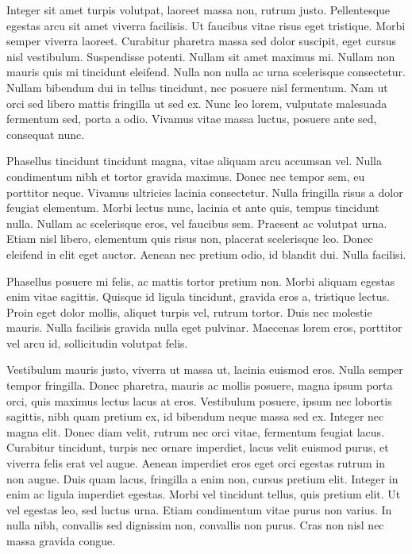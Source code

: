 \documentclass[book,A4paper,10pt,twoside,oldfontcommands]{memoir}\usepackage[]{graphicx}\usepackage[usenames,dvipsnames]{color}
\begin{document}
\begin{btUnit}
Integer sit amet turpis volutpat, laoreet massa non, rutrum justo.
Pellentesque egestas arcu sit amet viverra facilisis. Ut faucibus
vitae risus eget tristique. Morbi semper viverra laoreet. Curabitur
pharetra massa sed dolor suscipit, eget cursus nisl vestibulum.
Suspendisse potenti. Nullam sit amet maximus mi. Nullam non mauris
quis mi tincidunt eleifend. Nulla non nulla ac urna scelerisque
consectetur. Nullam bibendum dui in tellus tincidunt, nec posuere nisl
fermentum. Nam ut orci sed libero mattis fringilla ut sed ex. Nunc leo
lorem, vulputate malesuada fermentum sed, porta a odio. Vivamus vitae
massa luctus, posuere ante sed, consequat nunc.

Phasellus tincidunt tincidunt magna, vitae aliquam arcu accumsan vel.
Nulla condimentum nibh et tortor gravida maximus. Donec nec tempor
sem, eu porttitor neque. Vivamus ultricies lacinia consectetur. Nulla
fringilla risus a dolor feugiat elementum. Morbi lectus nunc, lacinia
et ante quis, tempus tincidunt nulla. Nullam ac scelerisque eros, vel
faucibus sem. Praesent ac volutpat urna. Etiam nisl libero, elementum
quis risus non, placerat scelerisque leo. Donec eleifend in elit eget
auctor. Aenean nec pretium odio, id blandit dui. Nulla facilisi.

Phasellus posuere mi felis, ac mattis tortor pretium non. Morbi
aliquam egestas enim vitae sagittis. Quisque id ligula tincidunt,
gravida eros a, tristique lectus. Proin eget dolor mollis, aliquet
turpis vel, rutrum tortor. Duis nec molestie mauris. Nulla facilisis
gravida nulla eget pulvinar. Maecenas lorem eros, porttitor vel arcu
id, sollicitudin volutpat felis.

Vestibulum mauris justo, viverra ut massa ut, lacinia euismod eros.
Nulla semper tempor fringilla. Donec pharetra, mauris ac mollis
posuere, magna ipsum porta orci, quis maximus lectus lacus at eros.
Vestibulum posuere, ipsum nec lobortis sagittis, nibh quam pretium ex,
id bibendum neque massa sed ex. Integer nec magna elit. Donec diam
velit, rutrum nec orci vitae, fermentum feugiat lacus. Curabitur
tincidunt, turpis nec ornare imperdiet, lacus velit euismod purus, et
viverra felis erat vel augue. Aenean imperdiet eros eget orci egestas
rutrum in non augue. Duis quam lacus, fringilla a enim non, cursus
pretium elit. Integer in enim ac ligula imperdiet egestas. Morbi vel
tincidunt tellus, quis pretium elit. Ut vel egestas leo, sed luctus
urna. Etiam condimentum vitae purus non varius. In nulla nibh,
convallis sed dignissim non, convallis non purus. Cras non nisl nec
massa gravida congue.


\end{btUnit}
\end{document}
